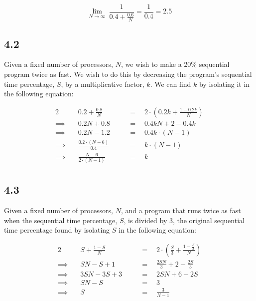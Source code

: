 \documentclass[11pt, letterpaper]{article}
\begin{document}
$$
\lim_{N \to \infty}\ {\frac{1}{0.4 + \frac{0.6}{N}}} = \frac{1}{0.4} = 2.5
$$

\subsection*{4.2}

Given a fixed number of processors, $N$, we wish to make a 20\% sequential program twice as fast. We wish to do this by decreasing the program's sequential time percentage, $S$, by a multiplicative factor, $k$. We can find $k$ by isolating it in the following equation:

\begin{alignat*}{2}
            & \quad 0.2 + \frac{0.8}{N}           \quad &&= \quad 2 \cdot \left(0.2 k + \frac{1 - 0.2 k}{N}\right)\\
    \implies& \quad 0.2N + 0.8                    \quad &&= \quad 0.4kN + 2 - 0.4k\\
    \implies& \quad 0.2N - 1.2                    \quad &&= \quad 0.4k \cdot (N - 1)\\
    \implies& \quad \frac{0.2 \cdot (N - 6)}{0.4} \quad &&= \quad k \cdot (N - 1)\\
    \implies& \quad \frac{N - 6}{2 \cdot (N - 1)} \quad &&= \quad k\\
\end{alignat*}

\pagebreak
\subsection*{4.3}

Given a fixed number of processors, $N$, and a program that runs twice as fast when the sequential time percentage, $S$, is divided by 3, the original sequential time percentage found by isolating $S$ in the following equation:

\begin{alignat*}{2}
            & \quad S + \frac{1-S}{N} \quad &&= \quad 2 \cdot \left(\frac{S}{3} + \frac{1-\frac{S}{3}}{N}\right)\\
    \implies& \quad SN - S + 1 \quad        &&= \quad \frac{2SN}{3} + 2 - \frac{2S}{3}\\
    \implies& \quad 3SN - 3S + 3 \quad      &&= \quad 2SN + 6 - 2S\\
    \implies& \quad SN - S \quad            &&= \quad 3\\
    \implies& \quad S \quad                 &&= \quad \frac{3}{N - 1}\\
\end{alignat*}
\end{document}
